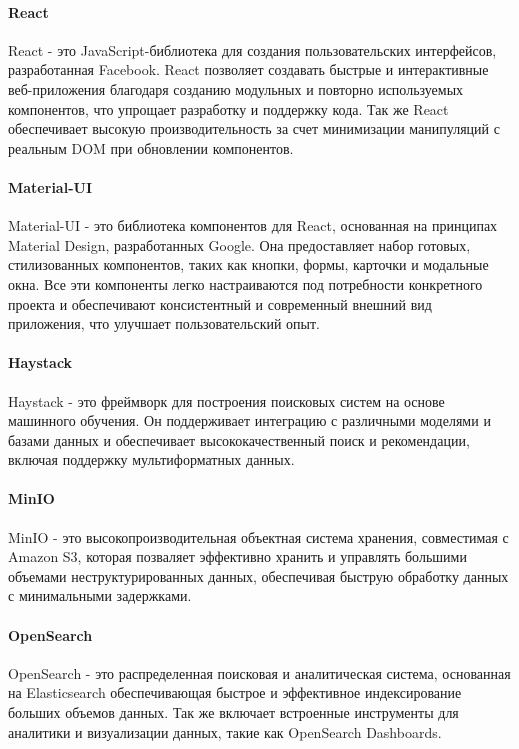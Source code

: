 \paragraph{React}

React - это JavaScript-библиотека для создания пользовательских интерфейсов, разработанная Facebook. React позволяет создавать быстрые и интерактивные веб-приложения благодаря созданию модульных и повторно используемых компонентов, что упрощает разработку и поддержку кода. Так же React обеспечивает высокую производительность за счет минимизации манипуляций с реальным DOM при обновлении компонентов.

\paragraph{Material-UI}

Material-UI - это библиотека компонентов для React, основанная на принципах Material Design, разработанных Google. Она предоставляет набор готовых, стилизованных компонентов, таких как кнопки, формы, карточки и модальные окна. Все эти компоненты легко настраиваются под потребности конкретного проекта и обеспечивают консистентный и современный внешний вид приложения, что улучшает пользовательский опыт.

\paragraph{Haystack}

Haystack - это фреймворк для построения поисковых систем на основе машинного обучения. Он поддерживает интеграцию с различными моделями и базами данных и обеспечивает высококачественный поиск и рекомендации, включая поддержку мультиформатных данных.

\paragraph{MinIO}

MinIO - это высокопроизводительная объектная система хранения, совместимая с Amazon S3, которая позваляет эффективно хранить и управлять большими объемами неструктурированных данных, обеспечивая быструю обработку данных с минимальными задержками.

\paragraph{OpenSearch}

OpenSearch - это распределенная поисковая и аналитическая система, основанная на Elasticsearch обеспечивающая быстрое и эффективное индексирование больших объемов данных. Так же включает встроенные инструменты для аналитики и визуализации данных, такие как OpenSearch Dashboards.

